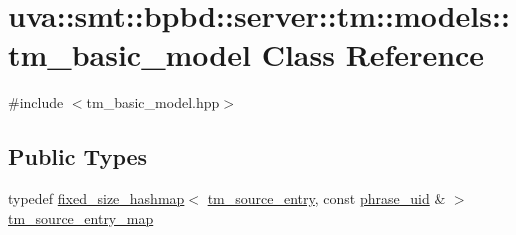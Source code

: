 \hypertarget{classuva_1_1smt_1_1bpbd_1_1server_1_1tm_1_1models_1_1tm__basic__model}{}\section{uva\+:\+:smt\+:\+:bpbd\+:\+:server\+:\+:tm\+:\+:models\+:\+:tm\+\_\+basic\+\_\+model Class Reference}
\label{classuva_1_1smt_1_1bpbd_1_1server_1_1tm_1_1models_1_1tm__basic__model}


{\ttfamily \#include $<$tm\+\_\+basic\+\_\+model.\+hpp$>$}

\subsection*{Public Types}
\begin{DoxyCompactItemize}
\item 
typedef \hyperlink{classuva_1_1utils_1_1containers_1_1fixed__size__hashmap}{fixed\+\_\+size\+\_\+hashmap}$<$ \hyperlink{classuva_1_1smt_1_1bpbd_1_1server_1_1tm_1_1models_1_1tm__source__entry}{tm\+\_\+source\+\_\+entry}, const \hyperlink{namespaceuva_1_1smt_1_1bpbd_1_1server_ad18d4cdf5504e76c22b0c124ff60b44f}{phrase\+\_\+uid} \& $>$ \hyperlink{classuva_1_1smt_1_1bpbd_1_1server_1_1tm_1_1models_1_1tm__basic__model_a9891bf54e4dd1e1bef92c662c9b1afab}{tm\+\_\+source\+\_\+entry\+\_\+map}
\end{DoxyCompactItemize}
